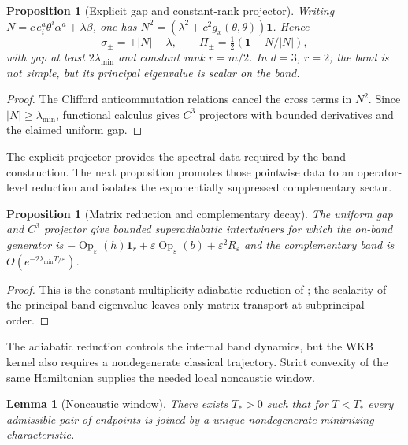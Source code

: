 \documentclass[11pt]{article}
\newtheorem{proposition}[theorem]{Proposition}
\newtheorem{lemma}[theorem]{Lemma}
\theoremstyle{definition}
\theoremstyle{remark}
\newcommand{\eps}{\varepsilon}
\begin{document}
\begin{proposition}[Explicit gap and constant-rank projector]
\label{prop:model-W2}
Writing $N=c\,e^a_i\theta^i\alpha^a+\lambda\beta$, one has
$N^2=(\lambda^2+c^2g_x(\theta,\theta))\mathbf 1$.  Hence
\[
 \sigma_\pm=\pm|N|-\lambda,
 \qquad
 \Pi_\pm=\tfrac12(\mathbf 1\pm N/|N|),
\]
with gap at least $2\lambda_{\min}$ and constant rank $r=m/2$.  In $d=3$,
$r=2$; the band is not simple, but its principal eigenvalue is scalar on the
band.
\end{proposition}

\begin{proof}
The Clifford anticommutation relations cancel the cross terms in $N^2$.  Since
$|N|\ge\lambda_{\min}$, functional calculus gives $C^3$ projectors with bounded
derivatives and the claimed uniform gap.
\end{proof}

The explicit projector provides the spectral data required by the band
construction. The next proposition promotes those pointwise data to an
operator-level reduction and isolates the exponentially suppressed
complementary sector.

\begin{proposition}[Matrix reduction and complementary decay]
\label{prop:model-W3}
The uniform gap and $C^3$ projector give bounded superadiabatic intertwiners for
which the on-band generator is
$-\operatorname{Op}_\eps(h)\mathbf 1_r+
 \eps\operatorname{Op}_\eps(b)+\eps^2R_\eps$ and the complementary band is
$O(e^{-2\lambda_{\min}T/\eps})$.
\end{proposition}

\begin{proof}
This is the constant-multiplicity adiabatic reduction of
\cite{Nenciu,Teufel,EmmrichWeinstein}; the scalarity of the principal band
eigenvalue leaves only matrix transport at subprincipal order.
\end{proof}

The adiabatic reduction controls the internal band dynamics, but the WKB
kernel also requires a nondegenerate classical trajectory. Strict convexity of
the same Hamiltonian supplies the needed local noncaustic window.

\begin{lemma}[Noncaustic window]
\label{lem:model-W4}
There exists $T_*>0$ such that for $T<T_*$ every admissible pair of endpoints is
joined by a unique nondegenerate minimizing characteristic.
\end{lemma}
\end{document}
